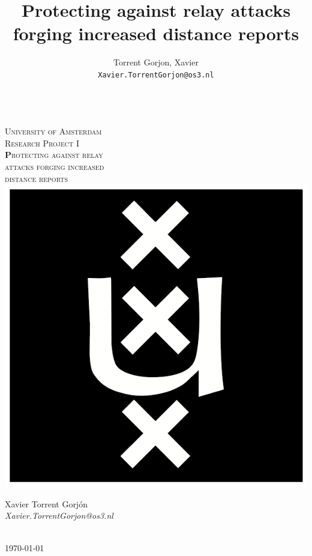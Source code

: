 \documentclass{article}
\author{
  Torrent Gorjon, Xavier\\
  \texttt{Xavier.TorrentGorjon@os3.nl}
}
\title{Protecting against relay attacks forging increased distance reports}
\begin{document}
\begin{titlepage}
\center
\textsc{}\\[1cm]
\textsc{\LARGE University of Amsterdam}\\[1.5cm]

\textsc{\Large Research Project I}\\[0.5cm]

\textsc{\Huge \textbf Protecting against relay\\[0cm] attacks forging increased\\[0.5cm] distance reports}\\[1.5cm]

\includegraphics[scale=1]{images/uva.png}\\[1cm]

\begin{minipage}{0.5 \textwidth}
\begin{center} \large
Xavier Torrent Gorj\'{o}n\\
\emph{Xavier.TorrentGorjon@os3.nl}\\[0.5cm]
\end{center}
\end{minipage}\\[2cm]
{\large \today} 


\end{titlepage}
\end{document}
